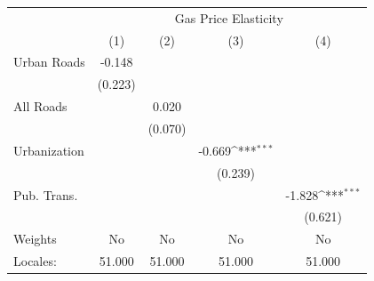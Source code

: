 {
\def\sym#1{\ifmmode^{#1}\else\(^{#1}\)\fi}
\begin{tabular}{l*{4}{c}}
\hline\hline
            &\multicolumn{4}{c}{Gas Price Elasticity}                                               \\
            &\multicolumn{1}{c}{(1)}         &\multicolumn{1}{c}{(2)}         &\multicolumn{1}{c}{(3)}         &\multicolumn{1}{c}{(4)}         \\
\hline
Urban Roads &      -0.148         &                     &                     &                     \\
            &     (0.223)         &                     &                     &                     \\
[1em]
All Roads   &                     &       0.020         &                     &                     \\
            &                     &     (0.070)         &                     &                     \\
[1em]
Urbanization&                     &                     &      -0.669\sym{***}&                     \\
            &                     &                     &     (0.239)         &                     \\
[1em]
Pub. Trans. &                     &                     &                     &      -1.828\sym{***}\\
            &                     &                     &                     &     (0.621)         \\
\hline
Weights     &          No         &          No         &          No         &          No         \\
Locales:    &      51.000         &      51.000         &      51.000         &      51.000         \\
\hline\hline
\end{tabular}
}
